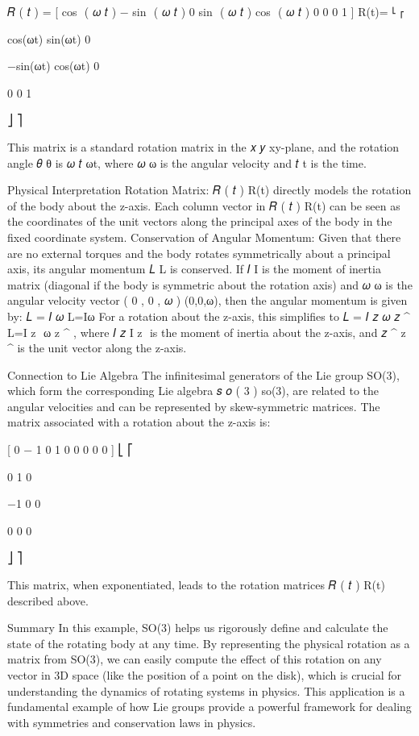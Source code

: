 \documentclass{article}
\begin{document}
𝑅
(
𝑡
)
=
[
cos
⁡
(
𝜔
𝑡
)
−
sin
⁡
(
𝜔
𝑡
)
0
sin
⁡
(
𝜔
𝑡
)
cos
⁡
(
𝜔
𝑡
)
0
0
0
1
]
R(t)= 
⎣
⎡
​
  
cos(ωt)
sin(ωt)
0
​
  
−sin(ωt)
cos(ωt)
0
​
  
0
0
1
​
  
⎦
⎤
​
 
This matrix is a standard rotation matrix in the 
𝑥
𝑦
xy-plane, and the rotation angle 
𝜃
θ is 
𝜔
𝑡
ωt, where 
𝜔
ω is the angular velocity and 
𝑡
t is the time.

Physical Interpretation
Rotation Matrix: 
𝑅
(
𝑡
)
R(t) directly models the rotation of the body about the z-axis. Each column vector in 
𝑅
(
𝑡
)
R(t) can be seen as the coordinates of the unit vectors along the principal axes of the body in the fixed coordinate system.
Conservation of Angular Momentum: Given that there are no external torques and the body rotates symmetrically about a principal axis, its angular momentum 
𝐿
L is conserved. If 
𝐼
I is the moment of inertia matrix (diagonal if the body is symmetric about the rotation axis) and 
𝜔
ω is the angular velocity vector 
(
0
,
0
,
𝜔
)
(0,0,ω), then the angular momentum is given by:
𝐿
=
𝐼
𝜔
L=Iω
For a rotation about the z-axis, this simplifies to 
𝐿
=
𝐼
𝑧
𝜔
𝑧
^
L=I 
z
​
 ω 
z
^
 , where 
𝐼
𝑧
I 
z
​
  is the moment of inertia about the z-axis, and 
𝑧
^
z
^
  is the unit vector along the z-axis.

Connection to Lie Algebra
The infinitesimal generators of the Lie group SO(3), which form the corresponding Lie algebra 
𝑠
𝑜
(
3
)
so(3), are related to the angular velocities and can be represented by skew-symmetric matrices. The matrix associated with a rotation about the z-axis is:

[
0
−
1
0
1
0
0
0
0
0
]
⎣
⎡
​
  
0
1
0
​
  
−1
0
0
​
  
0
0
0
​
  
⎦
⎤
​
 
This matrix, when exponentiated, leads to the rotation matrices 
𝑅
(
𝑡
)
R(t) described above.

Summary
In this example, SO(3) helps us rigorously define and calculate the state of the rotating body at any time. By representing the physical rotation as a matrix from SO(3), we can easily compute the effect of this rotation on any vector in 3D space (like the position of a point on the disk), which is crucial for understanding the dynamics of rotating systems in physics. This application is a fundamental example of how Lie groups provide a powerful framework for dealing with symmetries and conservation laws in physics.
\end{document}

